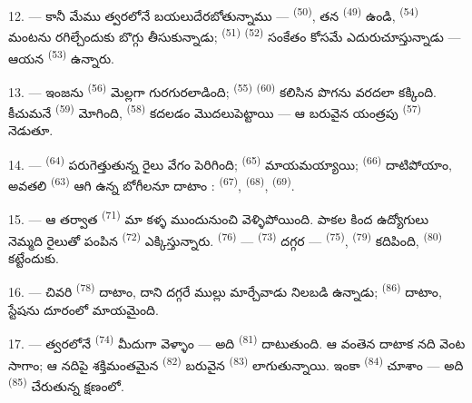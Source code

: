 12. --- కానీ మేము త్వరలోనే బయలుదేరబోతున్నాము — 
\textsuperscript{(50)}, తన  \textsuperscript{(49)} ఉండి,
 \textsuperscript{(54)} మంటను రగిల్చేందుకు బొగ్గు తీసుకున్నాడు;
 \textsuperscript{(51)}  \textsuperscript{(52)}
సంకేతం కోసమే ఎదురుచూస్తున్నాడు — ఆయన  \textsuperscript{(53)}
ఉన్నారు.

13. --- ఇంజను  \textsuperscript{(56)} మెల్లగా గురగురలాడింది;
 \textsuperscript{(55)}  \textsuperscript{(60)} కలిసిన
పొగను వరదలా కక్కింది. కీచుమనే  \textsuperscript{(59)} మోగింది,
 \textsuperscript{(58)} కదలడం మొదలుపెట్టాయి — ఆ బరువైన యంత్రపు
 \textsuperscript{(57)} నెడుతూ.

\VUsaut{3.0mm}
\VUsaut{3.0mm}

14. ---  \textsuperscript{(64)} పరుగెత్తుతున్న రైలు వేగం పెరిగింది;
 \textsuperscript{(65)} మాయమయ్యాయి; 
\textsuperscript{(66)} దాటిపోయాం, అవతలి  \textsuperscript{(63)} ఆగి
ఉన్న బోగీలనూ దాటాం :  \textsuperscript{(67)},
 \textsuperscript{(68)},  \textsuperscript{(69)}.


15. --- ఆ తర్వాత  \textsuperscript{(71)} మా కళ్ళ ముందునుంచి
వెళ్ళిపోయింది. పాకల కింద ఉద్యోగులు నెమ్మది రైలుతో పంపిన 
\textsuperscript{(72)} ఎక్కిస్తున్నారు.  \textsuperscript{(76)} —
 \textsuperscript{(73)} దగ్గర — 
\textsuperscript{(75)},  \textsuperscript{(79)} కదిపింది,
 \textsuperscript{(80)} కట్టేందుకు.

16. --- చివరి  \textsuperscript{(78)} దాటాం, దాని దగ్గరే ముల్లు
మార్చేవాడు నిలబడి ఉన్నాడు;  \textsuperscript{(86)} దాటాం,
స్టేషను దూరంలో మాయమైంది.

17. --- త్వరలోనే  \textsuperscript{(74)} మీదుగా వెళ్ళాం — అది
 \textsuperscript{(81)} దాటుతుంది. ఆ వంతెన దాటాక నది వెంట సాగాం; ఆ నదిపై
శక్తిమంతమైన  \textsuperscript{(82)} బరువైన 
\textsuperscript{(83)} లాగుతున్నాయి. ఇంకా  \textsuperscript{(84)}
చూశాం — అది  \textsuperscript{(85)} చేరుతున్న క్షణంలో.

